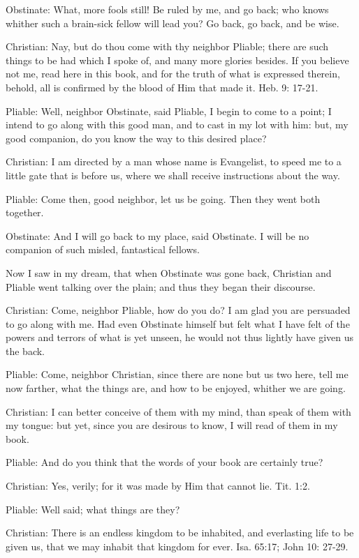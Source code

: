 Obstinate: What, more fools still! Be ruled by me, and go back; who knows whither such a brain-sick fellow will lead you? Go back, go back, and be wise. 

Christian: Nay, but do thou come with thy neighbor Pliable; there are such things to be had which I spoke of, and many more glories besides. If you believe not me, read here in this book, and for the truth of what is expressed therein, behold, all is confirmed by the blood of Him that made it. Heb. 9: 17-21. 

Pliable: Well, neighbor Obstinate, said Pliable, I begin to come to a point; I intend to go along with this good man, and to cast in my lot with him: but, my good companion, do you know the way to this desired place? 

Christian: I am directed by a man whose name is Evangelist, to speed me to a little gate that is before us, where we shall receive instructions about the way. 

Pliable: Come then, good neighbor, let us be going. Then they went both together. 

Obstinate: And I will go back to my place, said Obstinate. I will be no companion of such misled, fantastical fellows. 

Now I saw in my dream, that when Obstinate was gone back, Christian and Pliable went talking over the plain; and thus they began their discourse. 

Christian: Come, neighbor Pliable, how do you do? I am glad you are persuaded to go along with me. Had even Obstinate himself but felt what I have felt of the powers and terrors of what is yet unseen, he would not thus lightly have given us the back. 

Pliable: Come, neighbor Christian, since there are none but us two here, tell me now farther, what the things are, and how to be enjoyed, whither we are going. 

Christian: I can better conceive of them with my mind, than speak of them with my tongue: but yet, since you are desirous to know, I will read of them in my book. 

Pliable: And do you think that the words of your book are certainly true? 

Christian: Yes, verily; for it was made by Him that cannot lie. Tit. 1:2. 

Pliable: Well said; what things are they? 

Christian: There is an endless kingdom to be inhabited, and everlasting life to be given us, that we may inhabit that kingdom for ever. Isa. 65:17; John 10: 27-29. 

